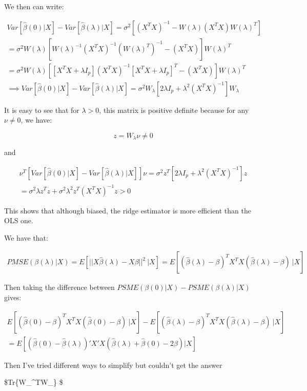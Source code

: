 \documentclass[
]{article}
\begin{document}
We then can write:

\begin{gather*}
Var[\hat{\beta}(0)|X]-Var[\hat{\beta}(\lambda)|X]=\sigma^2[(X^TX)^{-1}-W(\lambda)(X^TX) W(\lambda)^T] \\
= \sigma^2 W(\lambda)[W(\lambda)^{-1}(X^TX)^{-1}(W(\lambda)^T)^{-1}-(X^TX)]W(\lambda)^T \\
= \sigma^2 W(\lambda)[[X^TX+\lambda I_p](X^TX)^{-1}[X^TX+\lambda I_p]^T-(X^TX)]W(\lambda)^T \\
\implies Var[\hat{\beta}(0)|X]-Var[\hat{\beta}(\lambda)|X]=\sigma^2W_{\lambda}[2\lambda I_p+\lambda^2(X^T X)^{-1}]W_{\lambda}
\end{gather*}

It is easy to see that for \(\lambda>0\), this matrix is positive
definite because for any \(\nu \neq 0\), we have:

\[ z=W_\lambda \nu \neq 0\]

and

\begin{gather*}
\nu^T[Var[\hat{\beta}(0)|X]-Var[\hat{\beta}(\lambda)|X]]\nu=\sigma^2 z^T[2\lambda I_p+\lambda^2(X^TX)^{-1}]z \\
=\sigma^2 \lambda z^Tz+\sigma^2\lambda^2z^T(X^TX)^{-1}z>0
\end{gather*}

This shows that although biased, the ridge estimator is more efficient
than the OLS one.

We have that:

\begin{gather*}
PMSE(\beta(\lambda)|X)=E\left[|| X\hat{\beta}(\lambda)-X\beta||^2 \ | X\right]=E[(\hat{\beta}(\lambda)-\beta)^TX^TX(\hat{\beta}(\lambda)-\beta) \ | X]
\end{gather*}

Then taking the difference between
\(PSME(\beta(0)|X)-PSME(\beta(\lambda)|X)\) gives:

\begin{gather*}
E[(\hat{\beta}(0)-\beta)^TX^TX(\hat{\beta}(0)-\beta) \ | X]-E[(\hat{\beta}(\lambda)-\beta)^TX^TX(\hat{\beta}(\lambda)-\beta) \ | X] \\
=E[(\hat{\beta}(0) - \hat{\beta}(\lambda))'X'X(\hat{\beta}(\lambda)+\hat{\beta}(0)-2\beta)| X ]
\end{gather*}

Then I've tried different ways to simplify but couldn't get the answer

\$\lambda Tr\{W\_\lambda\^{}TW\_\}
\$
\end{document}
